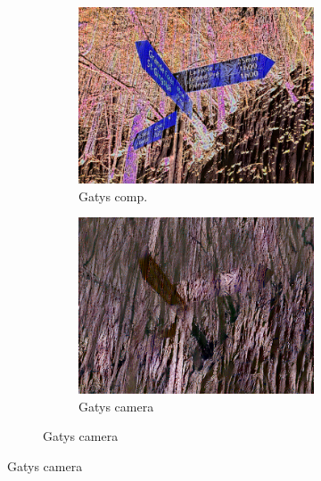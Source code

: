 \begin{figure}[]
\begin{subfigure}{\textwidth}
\begin{subfigure}{0.24\textwidth}
            \centering
            \includegraphics[width=\textwidth]{images/04-experiment02/photo/wood/gatys_im.jpg}
            \caption*{Gatys comp.}
        \end{subfigure}
        \hfill
        \begin{subfigure}{0.24\textwidth}
            \centering
            \includegraphics[width=\textwidth]{images/04-experiment02/photo/wood/gatys_proj.jpg}
            \caption*{Gatys camera}
        \end{subfigure}
        

\end{subfigure}
\end{figure}

